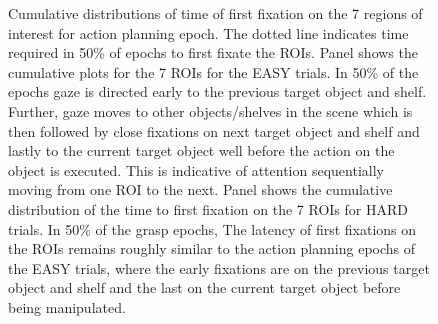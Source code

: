 \begin{figure}[h]
    \centering
    \caption[]{Cumulative distributions of time of first fixation on the 7 regions of interest for action planning epoch. The dotted line indicates time required in 50\% of epochs to first fixate the ROIs.
    Panel \protect{} shows the cumulative plots for the 7 ROIs for the EASY trials. In 50\% of the epochs gaze is directed early to the previous target object and shelf. Further, gaze moves to other objects/shelves in the scene which is then followed by close fixations on next target object and shelf and lastly to the current target object well before the action on the object is executed. This is indicative of attention sequentially moving from one ROI to the next.
    Panel \protect{} shows the cumulative distribution of the time to first fixation on the 7 ROIs for HARD trials. In 50\% of the grasp epochs, The latency of first fixations on the ROIs remains roughly similar to the action planning epochs of the EASY trials, where the early fixations are on the previous target object and shelf and the last on the current target object before being manipulated.}
     \label{figure:t50_overall_plan}
\end{figure}